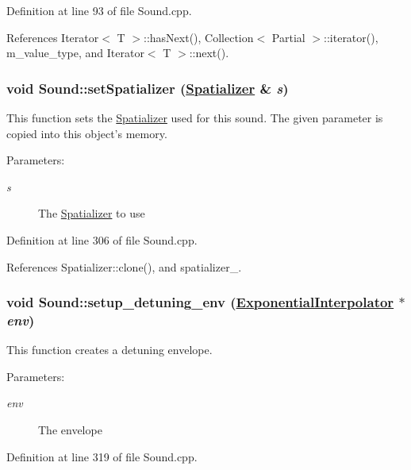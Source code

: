 Definition at line 93 of file Sound.cpp.

References Iterator$<$ T $>$::has\-Next(), Collection$<$ Partial $>$::iterator(), m\_\-value\_\-type, and Iterator$<$ T $>$::next().\hypertarget{classSound_a7}{
\subsubsection[setSpatializer]{\setlength{\rightskip}{0pt plus 5cm}void Sound::set\-Spatializer (\hyperlink{classSpatializer}{Spatializer} \& {\em s})}}
\label{classSound_a7}


This function sets the \hyperlink{classSpatializer}{Spatializer} used for this sound. The given parameter is copied into this object's memory. \begin{Desc}
\item[Parameters:]
\begin{description}
\item[{\em s}]The \hyperlink{classSpatializer}{Spatializer} to use \end{description}
\end{Desc}


Definition at line 306 of file Sound.cpp.

References Spatializer::clone(), and spatializer\_\-.\hypertarget{classSound_d0}{
\subsubsection[setup\_\-detuning\_\-env]{\setlength{\rightskip}{0pt plus 5cm}void Sound::setup\_\-detuning\_\-env (\hyperlink{classExponentialInterpolator}{Exponential\-Interpolator} $\ast$ {\em env})}}
\label{classSound_d0}


This function creates a detuning envelope. \begin{Desc}
\item[Parameters:]
\begin{description}
\item[{\em env}]The envelope \end{description}
\end{Desc}


Definition at line 319 of file Sound.cpp.

